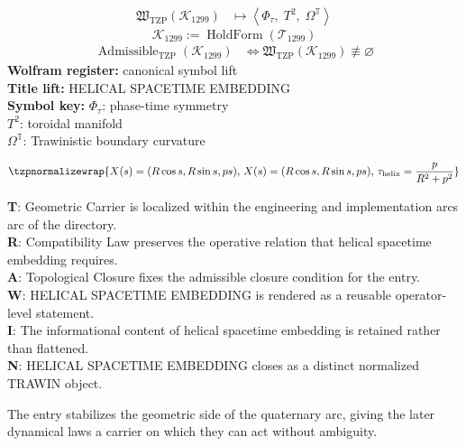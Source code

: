 \noindent
\begin{minipage}[t]{0.48\linewidth}
\begingroup
\small
\[
\begin{aligned}
\mathfrak{W}_{\mathrm{TZP}}\!\left(\mathcal{K}_{1299}\right)
&\longmapsto
\left\langle \Phi_{\tau},\; T^{2},\; \Omega^{\mathbb{T}} \right\rangle
\end{aligned}
\]
\[
\mathcal{K}_{1299}
:=
\operatorname{HoldForm}\!\left(\mathcal{T}_{1299}\right)
\]
\[
\begin{aligned}
\operatorname{Admissible}_{\mathrm{TZP}}\!\left(\mathcal{K}_{1299}\right)
&\Longleftrightarrow
\mathfrak{W}_{\mathrm{TZP}}\!\left(\mathcal{K}_{1299}\right)\not\equiv\varnothing
\end{aligned}
\]
\textbf{Wolfram register:} canonical symbol lift\\
\textbf{Title lift:} HELICAL SPACETIME EMBEDDING\\
\textbf{Symbol key:} \(\Phi_{\tau}\): phase-time symmetry\\ \(T^{2}\): toroidal manifold\\ \(\Omega^{\mathbb{T}}\): Trawinistic boundary curvature
\par
\endgroup
\end{minipage}\hfill
\begin{minipage}[t]{0.48\linewidth}
\[
\tzpnormalizewrap{X(s)=(R\cos s,R\sin s,ps),\,X(s)=(R\cos s,R\sin s,ps),\,\tau_{\mathrm{helix}}=\frac{p}{R^2+p^2}}
\]

\small
\textbf{T}: Geometric Carrier is localized within the engineering and implementation arcs arc of the directory.\\
\textbf{R}: Compatibility Law preserves the operative relation that helical spacetime embedding requires.\\
\textbf{A}: Topological Closure fixes the admissible closure condition for the entry.\\
\textbf{W}: HELICAL SPACETIME EMBEDDING is rendered as a reusable operator-level statement.\\
\textbf{I}: The informational content of helical spacetime embedding is retained rather than flattened.\\
\textbf{N}: HELICAL SPACETIME EMBEDDING closes as a distinct normalized TRAWIN object.
\normalsize
\end{minipage}

The entry stabilizes the geometric side of the quaternary arc, giving the later dynamical laws a carrier on which they can act without ambiguity.
\clearpage


